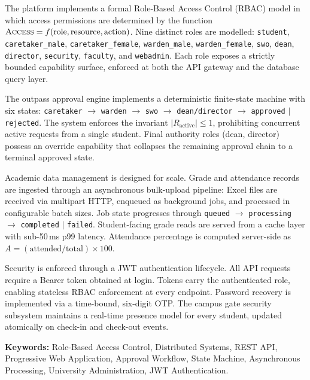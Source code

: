 \documentclass[12pt,a4paper]{report}
\newcommand{\role}[1]{\texttt{#1}}
\begin{document}
\vspace{0.4cm}
\noindent The platform implements a formal Role-Based Access Control (RBAC) model in which access permissions are determined by the function $\textsc{Access} = f(\text{role}, \text{resource}, \text{action})$. Nine distinct roles are modelled: \role{student}, \role{caretaker\_male}, \role{caretaker\_female}, \role{warden\_male}, \role{warden\_female}, \role{swo}, \role{dean}, \role{director}, \role{security}, \role{faculty}, and \role{webadmin}. Each role exposes a strictly bounded capability surface, enforced at both the API gateway and the database query layer.

\vspace{0.4cm}
\noindent The outpass approval engine implements a deterministic finite-state machine with six states: \texttt{caretaker} $\to$ \texttt{warden} $\to$ \texttt{swo} $\to$ \texttt{dean/director} $\to$ \texttt{approved} $\mid$ \texttt{rejected}. The system enforces the invariant $|R_{\text{active}}| \leq 1$, prohibiting concurrent active requests from a single student. Final authority roles (dean, director) possess an override capability that collapses the remaining approval chain to a terminal approved state.

\vspace{0.4cm}
\noindent Academic data management is designed for scale. Grade and attendance records are ingested through an asynchronous bulk-upload pipeline: Excel files are received via multipart HTTP, enqueued as background jobs, and processed in configurable batch sizes. Job state progresses through \texttt{queued} $\to$ \texttt{processing} $\to$ \texttt{completed} $\mid$ \texttt{failed}. Student-facing grade reads are served from a cache layer with sub-50\,ms p99 latency. Attendance percentage is computed server-side as $A = (\text{attended} / \text{total}) \times 100$.

\vspace{0.4cm}
\noindent Security is enforced through a JWT authentication lifecycle. All API requests require a Bearer token obtained at login. Tokens carry the authenticated role, enabling stateless RBAC enforcement at every endpoint. Password recovery is implemented via a time-bound, six-digit OTP. The campus gate security subsystem maintains a real-time presence model for every student, updated atomically on check-in and check-out events.

\vspace{0.6cm}
\noindent \textbf{Keywords:} Role-Based Access Control, Distributed Systems, REST API, Progressive Web Application, Approval Workflow, State Machine, Asynchronous Processing, University Administration, JWT Authentication.
\end{document}
